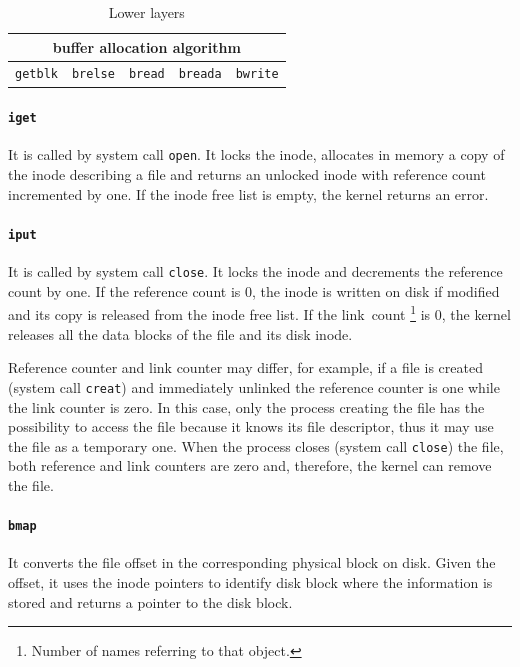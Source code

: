 \documentclass{report}
\begin{document}
\begin{table}
\centering
\begin{tabular}{|c|c|c|c|c|}
\hline 
\multicolumn{5}{|c|}{buffer allocation algorithm} \\ 
\hline 
\texttt{getblk} & \texttt{brelse} & \texttt{bread} & \texttt{breada} & \texttt{bwrite} \\ 
\hline 
\end{tabular} 
\caption{Lower layers}
\label{system_mgmt_lower_layers}
\end{table}

\paragraph{\texttt{iget}} It is called by system call \texttt{open}. It locks the inode, allocates in memory a copy of the inode describing a file and returns an unlocked inode with reference count incremented by one. If the inode free list is empty, the kernel returns an error.

\paragraph{\texttt{iput}} It is called by system call \texttt{close}. It locks the inode and decrements the reference count by one. If the reference count is 0, the inode is written on disk if modified and its copy is released from the inode free list. If the link~count \footnote{Number of names referring to that object.} is 0, the kernel releases all the data blocks of the file and its disk inode.

Reference counter and link counter may differ, for example, if a file is created (system call \texttt{creat}) and immediately unlinked the reference counter is one while the link counter is zero. In this case, only the process creating the file has the possibility to access the file because it knows its file descriptor, thus it may use the file as a temporary one. When the process closes (system call \texttt{close}) the file, both reference and link counters are zero and, therefore, the kernel can remove the file.

\paragraph{\texttt{bmap}} It converts the file offset in the corresponding physical block on disk. Given the offset, it uses the inode pointers to identify disk block where the information is stored and returns a pointer to the disk block.
\end{document}
